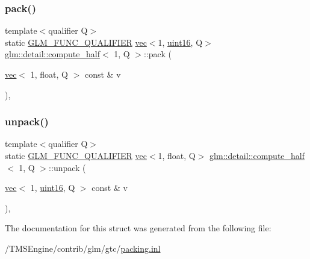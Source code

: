 \subsubsection{\texorpdfstring{pack()}{pack()}}
{\footnotesize\ttfamily template$<$qualifier Q$>$ \\
static \hyperlink{setup_8hpp_a33fdea6f91c5f834105f7415e2a64407}{G\+L\+M\+\_\+\+F\+U\+N\+C\+\_\+\+Q\+U\+A\+L\+I\+F\+I\+ER} \hyperlink{structglm_1_1vec}{vec}$<$1, \hyperlink{namespaceglm_1_1detail_a47b2a7d006d187338e8031a352d1ce56}{uint16}, Q$>$ \hyperlink{structglm_1_1detail_1_1compute__half}{glm\+::detail\+::compute\+\_\+half}$<$ 1, Q $>$\+::pack (\begin{DoxyParamCaption}\item[{\hyperlink{structglm_1_1vec}{vec}$<$ 1, float, Q $>$ const \&}]{v }\end{DoxyParamCaption})\hspace{0.3cm}{\ttfamily [inline]}, {\ttfamily [static]}}

\mbox{\label{structglm_1_1detail_1_1compute__half_3_011_00_01_q_01_4_a746beaa20b378bd4b7680b786c31e2c5}} 
\subsubsection{\texorpdfstring{unpack()}{unpack()}}
{\footnotesize\ttfamily template$<$qualifier Q$>$ \\
static \hyperlink{setup_8hpp_a33fdea6f91c5f834105f7415e2a64407}{G\+L\+M\+\_\+\+F\+U\+N\+C\+\_\+\+Q\+U\+A\+L\+I\+F\+I\+ER} \hyperlink{structglm_1_1vec}{vec}$<$1, float, Q$>$ \hyperlink{structglm_1_1detail_1_1compute__half}{glm\+::detail\+::compute\+\_\+half}$<$ 1, Q $>$\+::unpack (\begin{DoxyParamCaption}\item[{\hyperlink{structglm_1_1vec}{vec}$<$ 1, \hyperlink{namespaceglm_1_1detail_a47b2a7d006d187338e8031a352d1ce56}{uint16}, Q $>$ const \&}]{v }\end{DoxyParamCaption})\hspace{0.3cm}{\ttfamily [inline]}, {\ttfamily [static]}}



The documentation for this struct was generated from the following file\+:\begin{DoxyCompactItemize}
\item 
/\+T\+M\+S\+Engine/contrib/glm/gtc/\hyperlink{packing_8inl}{packing.\+inl}\end{DoxyCompactItemize}
